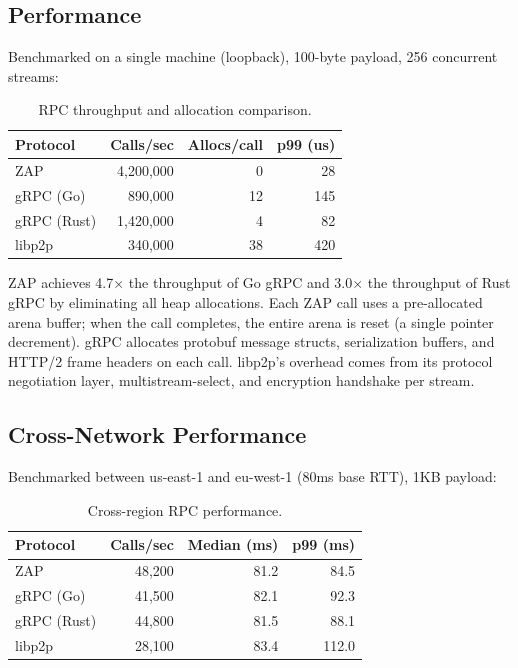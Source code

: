 \subsection{Performance}

Benchmarked on a single machine (loopback), 100-byte payload, 256 concurrent streams:

\begin{table}[H]
\centering
\caption{RPC throughput and allocation comparison.}
\footnotesize
\begin{tabular}{@{}lrrr@{}}
\toprule
Protocol & Calls/sec & Allocs/call & p99 (us) \\
\midrule
ZAP & 4,200,000 & 0 & 28 \\
gRPC (Go) & 890,000 & 12 & 145 \\
gRPC (Rust) & 1,420,000 & 4 & 82 \\
libp2p & 340,000 & 38 & 420 \\
\bottomrule
\end{tabular}
\end{table}

ZAP achieves 4.7$\times$ the throughput of Go gRPC and 3.0$\times$ the throughput of Rust gRPC by eliminating all heap allocations. Each ZAP call uses a pre-allocated arena buffer; when the call completes, the entire arena is reset (a single pointer decrement). gRPC allocates protobuf message structs, serialization buffers, and HTTP/2 frame headers on each call. libp2p's overhead comes from its protocol negotiation layer, multistream-select, and encryption handshake per stream.

\subsection{Cross-Network Performance}

Benchmarked between us-east-1 and eu-west-1 (80ms base RTT), 1KB payload:

\begin{table}[H]
\centering
\caption{Cross-region RPC performance.}
\footnotesize
\begin{tabular}{@{}lrrr@{}}
\toprule
Protocol & Calls/sec & Median (ms) & p99 (ms) \\
\midrule
ZAP & 48,200 & 81.2 & 84.5 \\
gRPC (Go) & 41,500 & 82.1 & 92.3 \\
gRPC (Rust) & 44,800 & 81.5 & 88.1 \\
libp2p & 28,100 & 83.4 & 112.0 \\
\bottomrule
\end{tabular}
\end{table}

